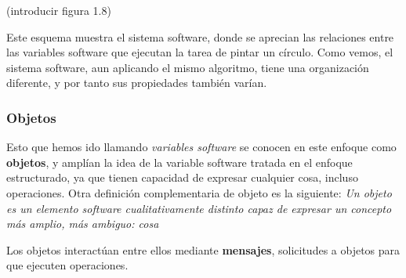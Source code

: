 (introducir figura 1.8)

Este esquema muestra el sistema software, donde se aprecian las
relaciones entre las variables software que ejecutan la tarea de
pintar un círculo.  Como vemos, el sistema software, aun aplicando el
mismo algoritmo, tiene una organización diferente, y por tanto sus
propiedades también varían.
\subsubsection{Objetos}
\label{sec:org2b984f4}
Esto que hemos ido llamando \emph{variables software} se conocen en
este enfoque como \textbf{objetos}, y amplían la idea de la variable
software tratada en el enfoque estructurado, ya que tienen capacidad
de expresar cualquier cosa, incluso operaciones.  Otra definición
complementaria de objeto es la siguiente: \emph{Un objeto es un
  elemento software cualitativamente distinto capaz de expresar un
  concepto más amplio, más ambiguo: cosa}

Los objetos interactúan entre ellos mediante \textbf{mensajes},
solicitudes a objetos para que ejecuten operaciones.

